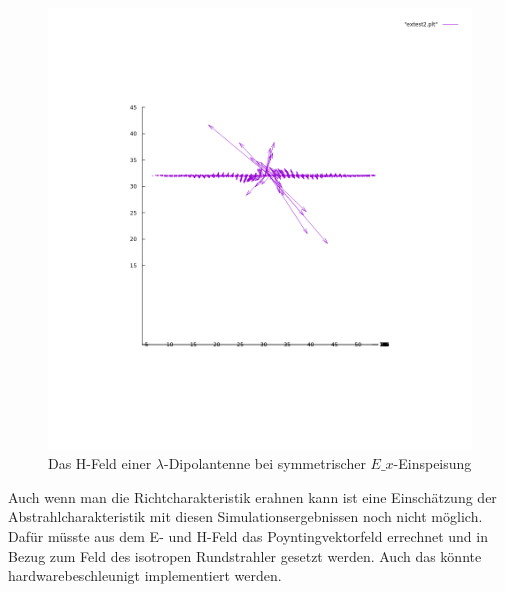 \documentclass[11pt, ngerman]{article}
\begin{document}
\begin{figure}[H]
\includegraphics[width=\textwidth]{./lambda_dipol_ex_source_xyplane_hfield_1.png}
	\caption{Das H-Feld einer \(\lambda\)-Dipolantenne bei symmetrischer \(E\_x\)-Einspeisung}
\end{figure}
\noindent Auch wenn man die Richtcharakteristik erahnen kann ist eine Einsch\"atzung der Abstrahlcharakteristik mit diesen Simulationsergebnissen noch nicht
m\"oglich. Daf\"ur m\"usste aus dem E- und H-Feld das Poyntingvektorfeld errechnet und in Bezug zum Feld des isotropen Rundstrahler gesetzt werden.
Auch das k\"onnte hardwarebeschleunigt implementiert werden.
\end{document}
